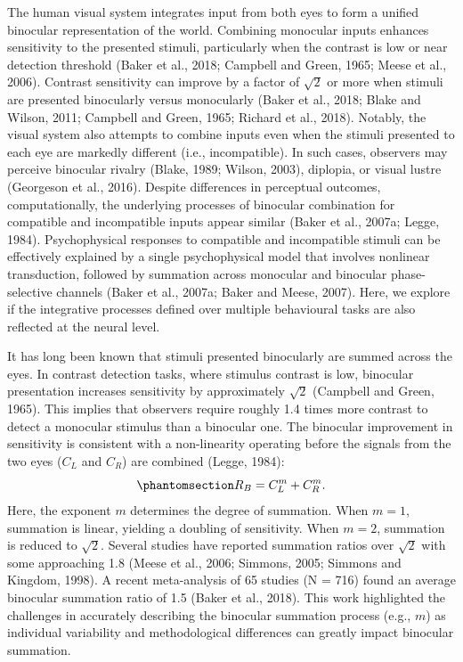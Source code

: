 \documentclass[
  12pt,
]{article}
\begin{document}
The human visual system integrates input from both eyes to form a
unified binocular representation of the world. Combining monocular
inputs enhances sensitivity to the presented stimuli, particularly when
the contrast is low or near detection threshold (Baker et al., 2018;
Campbell and Green, 1965; Meese et al., 2006). Contrast sensitivity can
improve by a factor of \(\sqrt{2}\) or more when stimuli are presented
binocularly versus monocularly (Baker et al., 2018; Blake and Wilson,
2011; Campbell and Green, 1965; Richard et al., 2018). Notably, the
visual system also attempts to combine inputs even when the stimuli
presented to each eye are markedly different (i.e., incompatible). In
such cases, observers may perceive binocular rivalry (Blake, 1989;
Wilson, 2003), diplopia, or visual lustre (Georgeson et al., 2016).
Despite differences in perceptual outcomes, computationally, the
underlying processes of binocular combination for compatible and
incompatible inputs appear similar (Baker et al., 2007a; Legge, 1984).
Psychophysical responses to compatible and incompatible stimuli can be
effectively explained by a single psychophysical model that involves
nonlinear transduction, followed by summation across monocular and
binocular phase-selective channels (Baker et al., 2007a; Baker and
Meese, 2007). Here, we explore if the integrative processes defined over
multiple behavioural tasks are also reflected at the neural level.

It has long been known that stimuli presented binocularly are summed
across the eyes. In contrast detection tasks, where stimulus contrast is
low, binocular presentation increases sensitivity by approximately
\(\sqrt{2}\) (Campbell and Green, 1965). This implies that observers
require roughly 1.4 times more contrast to detect a monocular stimulus
than a binocular one. The binocular improvement in sensitivity is
consistent with a non-linearity operating before the signals from the
two eyes (\(C_L\) and \(C_R\)) are combined (Legge, 1984):
\begin{equation}\phantomsection\label{eq-IntroMath1}{
R_B = C_L^m + C_R^m.
}\end{equation} Here, the exponent \(m\) determines the degree of
summation. When \(m = 1\), summation is linear, yielding a doubling of
sensitivity. When \(m = 2\), summation is reduced to \(\sqrt{2}\).
Several studies have reported summation ratios over \(\sqrt{2}\) with
some approaching 1.8 (Meese et al., 2006; Simmons, 2005; Simmons and
Kingdom, 1998). A recent meta-analysis of 65 studies (N = 716) found an
average binocular summation ratio of 1.5 (Baker et al., 2018). This work
highlighted the challenges in accurately describing the binocular
summation process (e.g., \(m\)) as individual variability and
methodological differences can greatly impact binocular summation.
\end{document}
